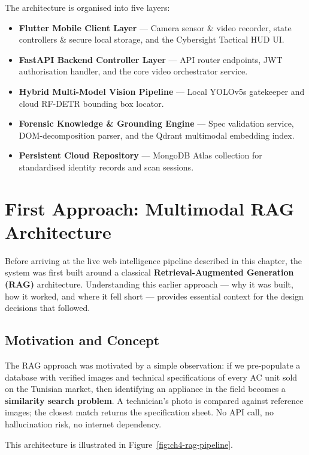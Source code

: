 The architecture is organised into five layers:
\begin{itemize}
  \item \textbf{Flutter Mobile Client Layer} — Camera sensor \& video recorder, state controllers \& secure local storage, and the Cybersight Tactical HUD UI.
  \item \textbf{FastAPI Backend Controller Layer} — API router endpoints, JWT authorisation handler, and the core video orchestrator service.
  \item \textbf{Hybrid Multi-Model Vision Pipeline} — Local YOLOv5s gatekeeper and cloud RF-DETR bounding box locator.
  \item \textbf{Forensic Knowledge \& Grounding Engine} — Spec validation service, DOM-decomposition parser, and the Qdrant multimodal embedding index.
  \item \textbf{Persistent Cloud Repository} — MongoDB Atlas collection for standardised identity records and scan sessions.
\end{itemize}

\section{First Approach: Multimodal RAG Architecture}
\label{sec:ch4-rag}

Before arriving at the live web intelligence pipeline described in this chapter, the system was first built around a classical \textbf{Retrieval-Augmented Generation (RAG)} architecture. Understanding this earlier approach — why it was built, how it worked, and where it fell short — provides essential context for the design decisions that followed.

\subsection{Motivation and Concept}

The RAG approach was motivated by a simple observation: if we pre-populate a database with verified images and technical specifications of every AC unit sold on the Tunisian market, then identifying an appliance in the field becomes a \textbf{similarity search problem}. A technician's photo is compared against reference images; the closest match returns the specification sheet. No API call, no hallucination risk, no internet dependency.

This architecture is illustrated in Figure~\ref{fig:ch4-rag-pipeline}.

